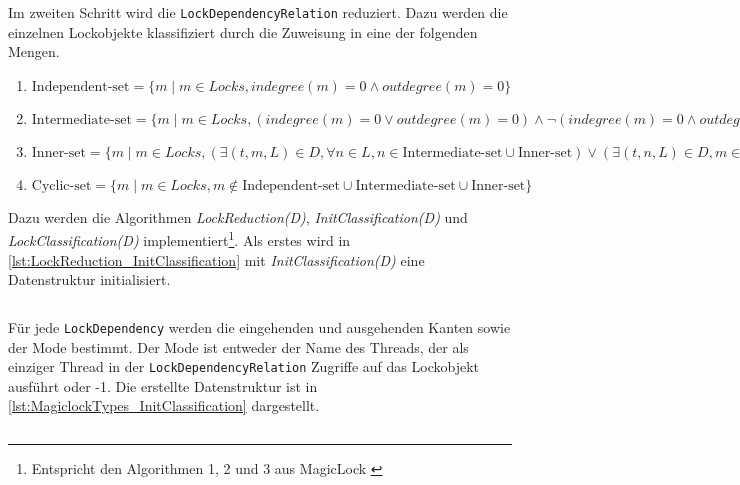 Im zweiten Schritt wird die \texttt{Lock\-Dependency\-Relation} reduziert. Dazu
werden die einzelnen Lockobjekte klassifiziert durch die Zuweisung in eine der
folgenden Mengen.\autocite[vgl.][4]{MagicLock}
\begin{enumerate}
  \item $\textrm{Independent-set} = \{m \mid m \in Locks, indegree(m) = 0 \land
  outdegree(m) = 0\}$
  \item $\textrm{Intermediate-set} = \{m \mid m \in Locks, (indegree(m) = 0 \lor
  outdegree(m) = 0) \land \lnot (indegree(m) = 0 \land outdegree(m) = 0)\}$
  \item $\textrm{Inner-set} = \{m \mid m \in Locks, (\exists (t,m,L) \in D,
  \forall n \in L, n \in \text{Intermediate-set} \cup \text{Inner-set}) \lor
  (\exists (t,n,L) \in D, m \in L \land n \in \text{Intermediate-set} \cup
  \text{Inner-set})\}$
  \item $\textrm{Cyclic-set} = \{m \mid m \in Locks, m \notin
  \text{Independent-set} \cup \text{Intermediate-set} \cup \text{Inner-set}\}$
\end{enumerate}
Dazu werden die Algorithmen \emph{LockReduction(D)},
\emph{InitClassification(D)} und \emph{LockClassification(D)}
implementiert\footnote{Entspricht den Algorithmen 1, 2 und 3 aus MagicLock
\autocite[5]{MagicLock}}. Als erstes wird in
\cref{lst:LockReduction_InitClassification} mit \emph{InitClassification(D)}
eine Datenstruktur initialisiert.
\begin{listing}[ht]
  \inputminted[frame=lines,linenos,firstline=17,lastline=32]{python}{./Python/magiclockLib/lockReduction.py}
  \caption{magiclockLib/lockReduction.py: Implementierung des \emph{InitClassification(D)}-Algorithmus aus Magiclock \autocite[5]{MagicLock}}
  \label{lst:LockReduction_InitClassification}
\end{listing}
Für jede \texttt{Lock\-Dependency} werden die eingehenden und ausgehenden Kanten
sowie der Mode bestimmt. Der Mode ist entweder der Name des Threads, der als
einziger Thread in der \texttt{Lock\-Dependency\-Relation} Zugriffe auf das
Lockobjekt ausführt oder -1. Die erstellte Datenstruktur ist in
\cref{lst:MagiclockTypes_InitClassification} dargestellt.
\begin{listing}[ht]
  \inputminted[frame=lines,linenos,firstline=3,lastline=8]{python}{./Python/magiclockLib/magiclockTypes.py}
  \caption{magiclockLib/magiclockTypes.py: Datenstruktur der \emph{init\_Classi\-fi\-cation(D)}-Methode}
  \label{lst:MagiclockTypes_InitClassification}
\end{listing}
